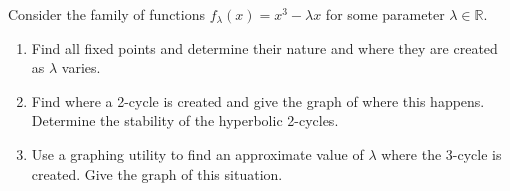 \begin{problem}{3}
  Consider the family of functions $f_\lambda(x) = x^3 - \lambda x$ for some parameter
  $\lambda \in \mathbb{R}$.

  \begin{enumerate}
    \item Find all fixed points and determine their nature and where they
      are created as $\lambda$ varies.
    \item Find where a 2-cycle is created
      and give the graph of where this happens. Determine the stability of the
      hyperbolic 2-cycles.
    \item Use a graphing utility to find an approximate
      value of $\lambda$ where the 3-cycle is created. Give the graph of this situation.
  \end{enumerate}
\end{problem}

